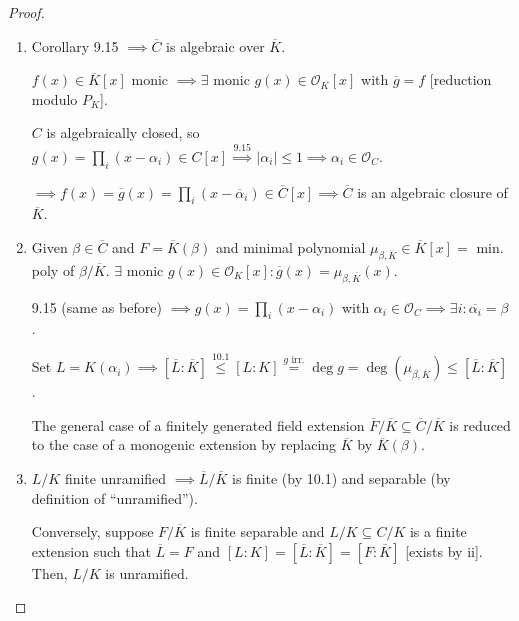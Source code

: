\documentclass[openany]{amsbook}
\numberwithin{section}{chapter}
\theoremstyle{definition}
\begin{document}
\begin{proof}
    \begin{enumerate}[label=\roman*)]
        \item Corollary 9.15 \(\implies \overline{C} \) is algebraic over \(\overline{K}\).
        
        \(f(x) \in \overline{K}[x]\) monic \(\implies \exists\) monic \(g(x) \in \mathcal{O}_K[x]\) with \(\overline{g} = f\) [reduction modulo \(P_K\)].
        
        \(C\) is algebraically closed, so \(g(x) = \prod_i (x-\alpha_i)\in C[x] \overset{9.15}{\implies} \vert \alpha_i \vert \leq 1 \implies \alpha_i \in \mathcal{O}_C\).

        \(\implies f(x) = \overline{g}(x) = \prod_i (x-\overline{\alpha}_i) \in \overline{C}[x] \implies \overline{C}\) is an algebraic closure of \(\overline{K}\).
        
        \item Given \(\beta \in \overline{C}\) and \(F = \overline{K}(\beta)\) and minimal polynomial \(\mu_{\beta, \overline{K}} \in \overline{K}[x] =\) min. poly of \(\beta / \overline{K}\).
        \(\exists\) monic \(g(x) \in \mathcal{O}_K [x] : \overline{g}(x) = \mu_{\beta, \overline{K}}(x)\).
        
        9.15 (same as before) \(\implies g(x) = \prod_i (x-\alpha_i)\) with \(\alpha_i \in \mathcal{O}_C \implies \exists i : \overline{\alpha_i} = \beta\).
        
        Set \(L = K(\alpha_i) \implies [\overline{L} : \overline{K}]\overset{10.1}{\leq} [L:K] \overset{g \text{ irr.}}{=} \deg g = \deg(\mu_{\beta, \overline{K}}) \leq [\overline{L} : \overline{K}]\).
        
        The general case of a finitely generated field extension \(\overline{F} / \overline{K} \subseteq \overline{C} / \overline{K}\) is reduced to the case of a monogenic extension by replacing \(\overline{K}\) by \(\overline{K}(\beta)\).

        \item \(L / K\) finite unramified \(\implies \overline{L} / \overline{K}\) is finite (by 10.1) and separable (by definition of ``unramified'').
        
        Conversely, suppose \(F / \overline{K}\) is finite separable and \(L / K \subseteq C / K\) is a finite extension such that \(\overline{L} = F\) and \([L:K] = [\overline{L} : \overline{K}] = [F : \overline{K}]\) [exists by ii]. Then, \(L / K\) is unramified.


\end{enumerate}
\end{proof}
\end{document}
